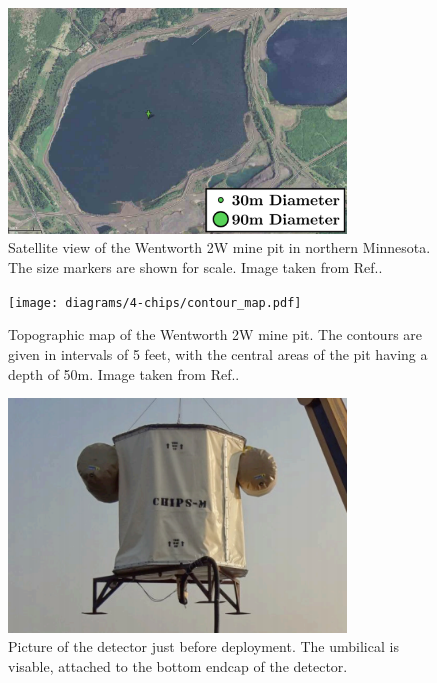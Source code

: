 \begin{figure} %
    \includegraphics[width=0.8\textwidth]{diagrams/4-chips/location.png}
    \caption[Satellite view of the Wentworth 2W mine pit.]
    {Satellite view of the Wentworth 2W mine pit in northern Minnesota.
        The size markers are shown for scale. Image taken from Ref.\cite{adamson2013}.}
    \label{fig:location}
\end{figure} %

\begin{figure} %
    \texttt{[image: diagrams/4-chips/contour\_map.pdf]}
    \caption[Topographic map of the Wentworth 2W mine pit.]
    {Topographic map of the Wentworth 2W mine pit. The contours are given in intervals of 5 feet,
        with the central areas of the pit having a depth of 50m. Image taken from
        Ref.\cite{adamson2013}.}
    \label{fig:contour_map}
\end{figure} %

\begin{figure} %
    \includegraphics[width=0.8\textwidth]{diagrams/4-chips/chips_m.png}
    \caption[Picture of the \chipsm detector.]
    {Picture of the \chipsm detector just before deployment. The umbilical is visable, attached to
        the bottom endcap of the detector.}
    \label{fig:chips_m}
\end{figure} %

